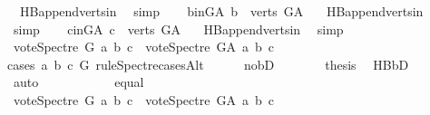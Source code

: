 \begin{isabellebody}
\ {}{\isacharparenleft}{\kern0pt}{}{\isacharparenright}{\kern0pt}\ HB{}{\isachardot}{\kern0pt}append{\isacharunderscore}{\kern0pt}verts{\isacharunderscore}{\kern0pt}in\ \isamarkupfalse%
\ simp\isanewline
\ \ \isamarkupfalse%
\ b{\isacharunderscore}{\kern0pt}in{\isacharunderscore}{\kern0pt}G{\isacharunderscore}{\kern0pt}A{\isacharcolon}{\kern0pt}\ {\isachardoublequoteopen}b\ {\isasymin}\ verts\ G{\isacharunderscore}{\kern0pt}A{\isachardoublequoteclose}\ \isamarkupfalse%
\ {}{\isacharparenleft}{\kern0pt}{}{\isacharparenright}{\kern0pt}\ HB{}{\isachardot}{\kern0pt}append{\isacharunderscore}{\kern0pt}verts{\isacharunderscore}{\kern0pt}in\ \isamarkupfalse%
\ simp\isanewline
\ \ \isamarkupfalse%
\ c{\isacharunderscore}{\kern0pt}in{\isacharunderscore}{\kern0pt}G{\isacharunderscore}{\kern0pt}A{\isacharcolon}{\kern0pt}\ {\isachardoublequoteopen}c\ {\isasymin}\ verts\ G{\isacharunderscore}{\kern0pt}A{\isachardoublequoteclose}\ \isamarkupfalse%
\ {}{\isacharparenleft}{\kern0pt}{}{\isacharparenright}{\kern0pt}\ HB{}{\isachardot}{\kern0pt}append{\isacharunderscore}{\kern0pt}verts{\isacharunderscore}{\kern0pt}in\ \isamarkupfalse%
\ simp\isanewline
\ \ \isamarkupfalse%
\ {\isachardoublequoteopen}vote{\isacharunderscore}{\kern0pt}Spectre\ G\ a\ b\ c\ {\isasymle}\ vote{\isacharunderscore}{\kern0pt}Spectre\ G{\isacharunderscore}{\kern0pt}A\ a\ b\ c{\isachardoublequoteclose}\isanewline
\ \ \isamarkupfalse%
{\isacharparenleft}{\kern0pt}cases\ a\ b\ c\ G\ rule{\isacharcolon}{\kern0pt}Spectre{\isacharunderscore}{\kern0pt}casesAlt{\isacharparenright}{\kern0pt}\isanewline
\ \ \ \ \isamarkupfalse%
\ no{\isacharunderscore}{\kern0pt}bD\isanewline
\ \ \ \ \isamarkupfalse%
\ \isamarkupfalse%
\ {\isacharquery}{\kern0pt}thesis\ \isamarkupfalse%
\ HB{}{\isachardot}{\kern0pt}bD\ {}{\isacharparenleft}{\kern0pt}{}{\isacharcomma}{\kern0pt}{}{\isacharcomma}{\kern0pt}{}{\isacharparenright}{\kern0pt}\ \isamarkupfalse%
\ auto\ \ \ \isanewline
\ \ \isamarkupfalse%
\isanewline
\ \ \ \ \isamarkupfalse%
\ equal\ \ \ \ \isanewline
\ \ \ \ \isamarkupfalse%
\ \isamarkupfalse%
\ {\isachardoublequoteopen}vote{\isacharunderscore}{\kern0pt}Spectre\ G\ a\ b\ c\ {\isasymle}\ vote{\isacharunderscore}{\kern0pt}Spectre\ G{\isacharunderscore}{\kern0pt}A\ a\ b\ c{\isachardoublequoteclose}\isanewline

\end{isabellebody}
